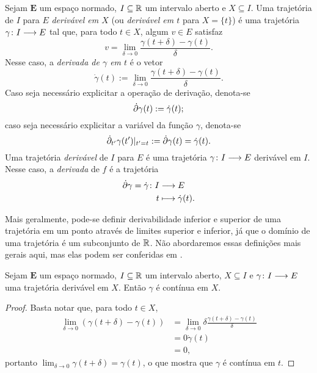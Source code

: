 \begin{definition}[Derivabilidade]
Sejam $\bm E$ um espaço normado, $I \subseteq \mathbb{R}$ um intervalo aberto e $X \subseteq I$. Uma trajetória de $I$ para $E$ \emph{derivável em $X$} (ou \emph{derivável em $t$} para $X=\{t\}$) é uma trajetória ${\gamma}\colon {I} \longrightarrow {E}$ tal que, para todo $t \in X$, algum $v \in E$ satisfaz
	\begin{equation*}
	v = \lim_{\delta \to 0} \frac{\gamma(t+\delta)-\gamma(t)}{\delta}.
	\end{equation*}
Nesse caso, a \emph{derivada de $\gamma$ em $t$} é o vetor
	\begin{equation*}
	\dot{\gamma} (t) := \lim_{\delta \to 0} \frac{\gamma(t+\delta)-\gamma(t)}{\delta}.
	\end{equation*}
Caso seja necessário explicitar a operação de derivação, denota-se
	\begin{equation*}
	\dot{\partial} \gamma(t) := \dot{\gamma} (t);
	\end{equation*}
caso seja necessário explicitar a variável da função $\gamma$, denota-se
	\begin{equation*}
	\dot{\partial}_{t'} \gamma(t')|_{t'=t} := \dot{\partial} \gamma(t) = \dot \gamma(t).
	\end{equation*}
Uma trajetória \emph{derivável} de $I$ para $E$ é uma trajetória ${\gamma}\colon {I} \longrightarrow {E}$ derivável em $I$. Nesse caso, a \emph{derivada} de $f$ é a trajetória
	\begin{align*}
	{\dot{\partial}\gamma = \dot \gamma}\colon {I} &\longrightarrow {E} \\{t} &\longmapsto \dot \gamma(t).
	\end{align*}
\end{definition}

Mais geralmente, pode-se definir derivabilidade inferior e superior de uma trajetória em um ponto através de limites superior e inferior, já que o domínio de uma trajetória é um subconjunto de $\mathbb{R}$. Não abordaremos essas definições mais gerais aqui, mas elas podem ser conferidas em \cite{liv:Cartan-DifferentialCalculus}.

\begin{proposition}
Sejam $\bm E$ um espaço normado, $I \subseteq \mathbb{R}$ um intervalo aberto, $X \subseteq I$ e ${\gamma}\colon {I} \longrightarrow {E}$ uma trajetória derivável em $X$. Então $\gamma$ é contínua em $X$.
\end{proposition}
\begin{proof}
Basta notar que, para todo $t \in X$,
	\begin{align*}
	\lim_{\delta \to 0} (\gamma(t+\delta)-\gamma(t)) &= \lim_{\delta \to 0} \delta\frac{\gamma(t+\delta)-\gamma(t)}{\delta} \\
		&= 0\dot \gamma(t) \\
		&= 0,
	\end{align*}
portanto $\lim_{\delta \to 0} \gamma(t+\delta) = \gamma(t)$, o que mostra que $\gamma$ é contínua em $t$.
\end{proof}

